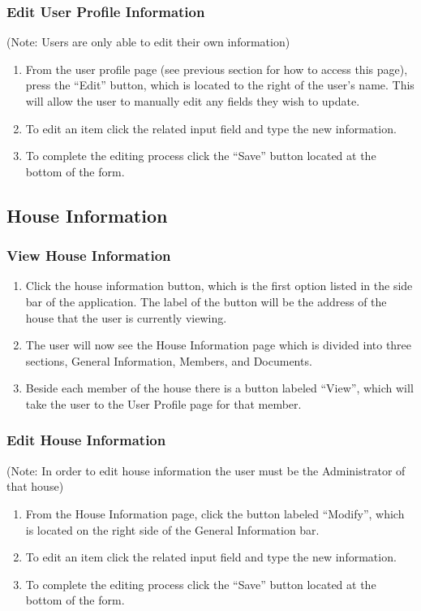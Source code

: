 \documentclass[12pt]{article}
\begin{document}
    \subsubsection{Edit User Profile Information}
    (Note: Users are only able to edit their own information)
    \begin{enumerate}
        \item From the user profile page (see previous section for how to access this page), press the ``Edit'' button, which is located to the right of the user's name. This will allow the user to manually edit any fields they wish to update.
        \item To edit an item click the related input field and type the new information.
        \item To complete the editing process click the ``Save'' button located at the bottom of the form.
    \end{enumerate}

    \subsection{House Information} %
    \subsubsection{View House Information}
    \begin{enumerate}
        \item Click the house information button, which is the first option listed in the side bar of the application. The label of the button will be the address of the house that the user is currently viewing.
        \item The user will now see the House Information page which is divided into three sections, General Information, Members, and Documents.
        \item Beside each member of the house there is a button labeled ``View'', which will take the user to the User Profile page for that member.
    \end{enumerate}

    \subsubsection{Edit House Information}
    (Note: In order to edit house information the user must be the Administrator of that house)
    \begin{enumerate}
        \item From the House Information page, click the button labeled ``Modify'', which is located on the right side of the General Information bar.
        \item To edit an item click the related input field and type the new information.
        \item To complete the editing process click the ``Save'' button located at the bottom of the form.
    \end{enumerate}
\end{document}
